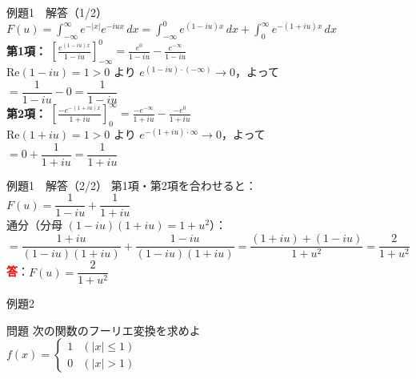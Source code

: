 \documentclass[professionalfonts]{beamer}
\begin{document}
\begin{frame}{例題1　解答（1/2）}
  $F(u) = \displaystyle\int_{-\infty}^{\infty}e^{-|x|}e^{-iux}\,dx
    = \int_{-\infty}^{0}e^{(1-iu)x}\,dx + \int_{0}^{\infty}e^{-(1+iu)x}\,dx$\\[6pt]
  \textbf{第1項：}
  $\displaystyle\left[\frac{e^{(1-iu)x}}{1-iu}\right]_{-\infty}^{0}
    = \frac{e^{0}}{1-iu} - \frac{e^{-\infty}}{1-iu}$\\[4pt]
  \hspace{2em}$\mathrm{Re}(1-iu)=1>0$ より $e^{(1-iu)\cdot(-\infty)}\to 0$，よって\\[2pt]
  \hspace{6em}$= \dfrac{1}{1-iu} - 0 = \dfrac{1}{1-iu}$\\[8pt]
  \textbf{第2項：}
  $\displaystyle\left[\frac{-e^{-(1+iu)x}}{1+iu}\right]_{0}^{\infty}
    = \frac{-e^{-\infty}}{1+iu} - \frac{-e^{0}}{1+iu}$\\[4pt]
  \hspace{2em}$\mathrm{Re}(1+iu)=1>0$ より $e^{-(1+iu)\cdot\infty}\to 0$，よって\\[2pt]
  \hspace{6em}$= 0 + \dfrac{1}{1+iu} = \dfrac{1}{1+iu}$
\end{frame}

\begin{frame}{例題1　解答（2/2）}
  第1項・第2項を合わせると：\\[6pt]
  $F(u) = \dfrac{1}{1-iu}+\dfrac{1}{1+iu}$\\[8pt]
  通分（分母 $(1-iu)(1+iu) = 1+u^{2}$）：\\[4pt]
  $= \dfrac{1+iu}{(1-iu)(1+iu)} + \dfrac{1-iu}{(1-iu)(1+iu)}
    = \dfrac{(1+iu)+(1-iu)}{1+u^{2}}
    = \dfrac{2}{1+u^{2}}$
  \\[12pt]\textcolor{red}{\textbf{答}}：$F(u) = \dfrac{2}{1+u^{2}}$
\end{frame}

\begin{frame}{例題2　}
  \begin{exampleblock}{問題}
    次の関数のフーリエ変換を求めよ\\[2pt]
    $f(x) = \begin{cases} 1 & (|x| \leq 1) \\ 0 & (|x| > 1) \end{cases}$\\[2pt]
  \end{exampleblock}
\end{frame}
\end{document}
